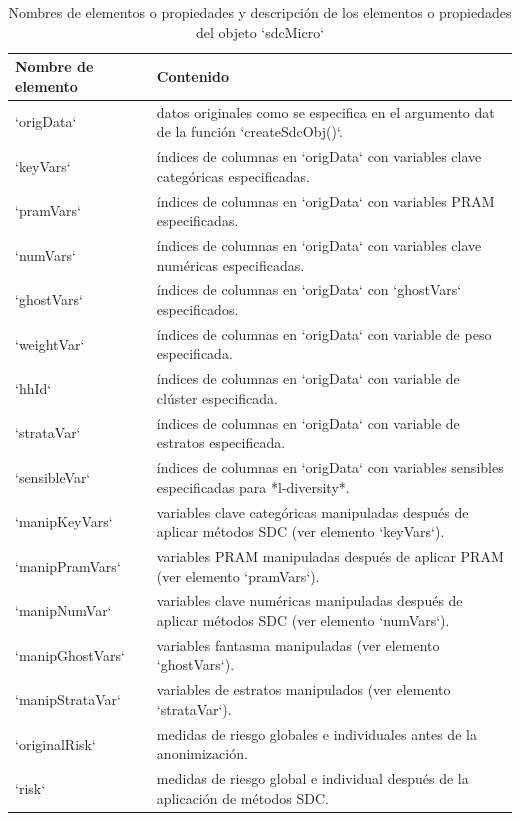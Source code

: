 \documentclass[]{book}
\theoremstyle{definition}
\theoremstyle{definition}
\theoremstyle{definition}
\theoremstyle{definition}
\theoremstyle{remark}
\begin{document}
\begin{table}

\caption{\label{tab:tabMicro2}Nombres de elementos o propiedades y descripción de los elementos o propiedades del objeto `sdcMicro`}
\centering
\begin{tabular}[t]{l|l}
\hline
Nombre de elemento & Contenido\\
\hline
`origData` & datos originales como se especifica en el argumento dat de la función `createSdcObj()`.\\
\hline
`keyVars` & índices de columnas en `origData` con variables clave categóricas especificadas.\\
\hline
`pramVars` & índices de columnas en `origData` con variables PRAM especificadas.\\
\hline
`numVars` & índices de columnas en `origData` con variables clave numéricas especificadas.\\
\hline
`ghostVars` & índices de columnas en `origData` con `ghostVars` especificados.\\
\hline
`weightVar` & índices de columnas en `origData` con variable de peso especificada.\\
\hline
`hhId` & índices de columnas en `origData` con variable de clúster especificada.\\
\hline
`strataVar` & índices de columnas en `origData` con variable de estratos especificada.\\
\hline
`sensibleVar` & índices de columnas en `origData` con variables sensibles especificadas para *l-diversity*.\\
\hline
`manipKeyVars` & variables clave categóricas manipuladas después de aplicar métodos SDC (ver elemento `keyVars`).\\
\hline
`manipPramVars` & variables PRAM manipuladas después de aplicar PRAM (ver elemento `pramVars`).\\
\hline
`manipNumVar` & variables clave numéricas manipuladas después de aplicar métodos SDC (ver elemento `numVars`).\\
\hline
`manipGhostVars` & variables fantasma manipuladas (ver elemento `ghostVars`).\\
\hline
`manipStrataVar` & variables de estratos manipulados (ver elemento `strataVar`).\\
\hline
`originalRisk` & medidas de riesgo globales e individuales antes de la anonimización.\\
\hline
`risk` & medidas de riesgo global e individual después de la aplicación de métodos SDC.\\

\end{tabular}
\end{table}
\end{document}

